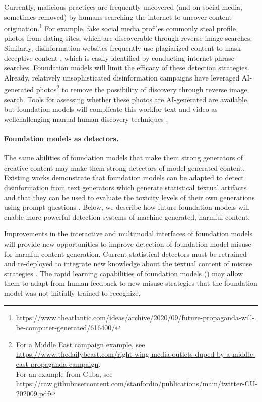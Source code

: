 Currently, malicious practices are frequently uncovered (and on social media, sometimes removed) by humans searching the internet to uncover content origination.\footnote{\href{https://www.theatlantic.com/ideas/archive/2020/09/future-propaganda-will-be-computer-generated/616400/}{{ https://www.theatlantic.com/ideas/archive/2020/09/future-propaganda-will-be-computer-generated/616400/}}}
For example, fake social media profiles commonly steal profile photos from dating sites, which are discoverable through reverse image searches. 
Similarly, disinformation websites frequently use plagiarized content to mask deceptive content \citep{DiResta2019PotemkinP}, which is easily identified by conducting internet phrase searches. 
Foundation models will limit the efficacy of these detection strategies. 
Already, relatively unsophisticated disinformation campaigns have leveraged AI-generated photos\footnote{For a Middle East campaign example, see \url{https://www.thedailybeast.com/right-wing-media-outlets-duped-by-a-middle-east-propaganda-campaign}. \\For an example from Cuba, see \url{https://raw.githubusercontent.com/stanfordio/publications/main/twitter-CU-202009.pdf}} to remove the possibility of discovery through reverse image search. 
Tools for assessing whether these photos are AI-generated are available, but foundation models will complicate this work\dash{}for text and video as well\dash{}challenging manual human discovery techniques \citep{Ippolito2020AutomaticDO,clark2021all}. 

\paragraph{Foundation models as detectors.} 
The same abilities of foundation models that make them strong generators of creative content may make them strong detectors of model-generated content. Existing works demonstrate that foundation models can be adapted to detect disinformation from text generators \citep{zellers2019neuralfakenews}\dash{}which generate statistical textual artifacts \citep{Holtzman2020TheCC}\dash{}and that they can be used to evaluate the toxicity levels of their own generations using prompt questions \citep{Schick2021SelfDiagnosisAS}. Below, we describe how future foundation models will enable more powerful detection systems of machine-generated, harmful content.

Improvements in the interactive and multimodal interfaces of foundation models will provide new opportunities to improve detection of foundation model misuse for harmful content generation. Current statistical detectors must be retrained and re-deployed to integrate new knowledge about the textual content of misuse strategies \citep{Dinan2019BuildIB}. The rapid learning capabilities of foundation models () may allow them to adapt from human feedback to new misuse strategies that the foundation model was not initially trained to recognize. 

